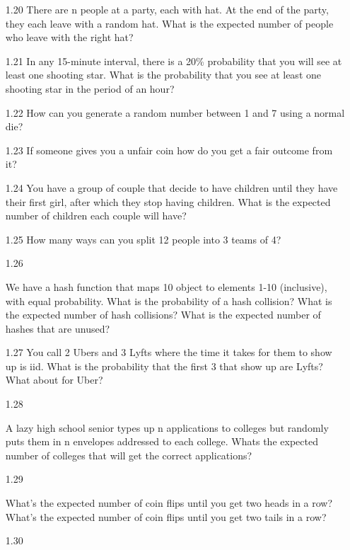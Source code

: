 \begin{enumerate}
\item[1.20]
There are n people at a party, each with hat. At the end of the party, they each leave with a random hat. What is the expected number of people who leave with the right hat?

\item[1.21]
In any 15-minute interval, there is a 20\% probability that you will see at least one shooting star. What is the probability that you see at least one shooting star in the period of an hour?

\item[1.22]
How can you generate a random number between 1 and 7 using a normal die?

\item[1.23]
If someone gives you a unfair coin how do you get a fair outcome from it?

\item[1.24]
You have a group of couple that decide to have children until they have their first girl, after which they stop having children. What is the expected number of children each couple will have?

\item[1.25]
How many ways can you split 12 people into 3 teams of 4?

\item[1.26]

We have a hash function that maps 10 object to elements 1-10 (inclusive), with equal probability. What is the probability of a hash collision? What is the expected number of hash collisions? What is the expected number of hashes that are unused?

\item[1.27]
You call 2 Ubers and 3 Lyfts where the time it takes for them to show up is iid. What is the probability that the first 3 that show up are Lyfts? What about for Uber?

\item[1.28]

A lazy high school senior types up n applications to colleges but randomly puts them in n envelopes addressed to each college. Whats the expected number of colleges that will get the correct applications?

\item[1.29]

What’s the expected number of coin flips until you get two heads in a row? What’s the expected number of coin flips until you get two tails in a row?

\item[1.30]


\end{enumerate}
